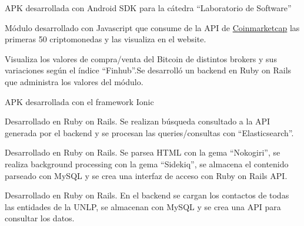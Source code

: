 
APK desarrollada con Android SDK para la cátedra “Laboratorio de Software”

\divider
{}
Módulo desarrollado con Javascript que consume de la API de \href{https://coinmarketcap.com/}{Coinmarketcap} las primeras 50 criptomonedas y las visualiza en el website.

\divider

Visualiza los valores de compra/venta del Bitcoin de distintos brokers y sus variaciones según el índice “Finhub”.Se desarrolló un backend en Ruby on Rails que administra los valores del módulo.

\divider

 APK desarrollada con el framework Ionic 

\divider

Desarrollado en Ruby on Rails. Se realizan búsqueda consultado a la API generada por el backend y se procesan las queries/consultas con “Elasticsearch”.

\divider

Desarrollado en Ruby on Rails. Se parsea HTML con la gema “Nokogiri”, se realiza background processing con la gema “Sidekiq”, se almacena el contenido parseado con MySQL y se crea una interfaz de acceso con Ruby on Rails API.

\divider

Desarrollado en Ruby on Rails. En el backend se cargan los contactos de todas las entidades de la UNLP, se almacenan con MySQL y se crea una API para consultar los datos.

